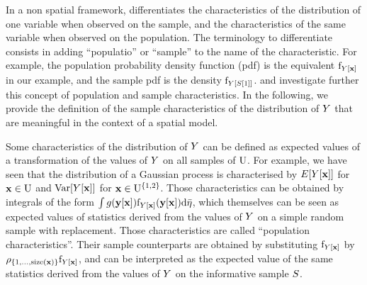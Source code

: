 In a non spatial framework,  \cite{pfefferman_1992} differentiates the characteristics of the distribution of one variable when observed on the sample, and the characteristics of the same variable when observed on the population. The terminology to differentiate consists in adding ``populatio'' or ``sample'' to the name of the characteristic. For example, the population probability density function (pdf) is the equivalent  $\mathrm{f}_{Y[\mathbf{x}]}$ in our example, and the sample pdf is the density $\mathrm{f}_{Y[S[1]]}$. \cite{bonnery2012uniform} and \cite{dbb1} investigate further this concept of population and sample characteristics.
In the following, we provide the definition of the sample characteristics of the distribution of $Y$ that are meaningful in the context of a spatial model.



Some characteristics of the distribution of $Y$ can be  defined as expected values of a transformation of the values of $Y$ on all samples of $\mathrm{U}$.
For example, we have seen that the distribution of 
a Gaussian process is characterised by $E[Y[\mathbf{x}]]$ for $\mathbf{x}\in \mathrm{U}$ and
$\mathrm{Var}[Y[\mathbf{x}]]$ for $\mathbf{x}\in \mathrm{U}^{\{1,2\}}$. Those characteristics can be obtained by integrals of the form $\int g(\mathbf{y}[\mathbf{x}]) \mathrm{f}_{Y[\mathbf{x}]}(\mathbf{y}[\mathbf{x}])\mathrm{d}\bar{\eta}$, which themselves can be seen as expected values of statistics derived from the values of $Y$ on a simple random sample with replacement.
Those characteristics are called ``population characteristics''. Their sample counterparts are obtained by substituting $ \mathrm{f}_{Y[\mathbf{x}]}$ by $\rho_{\{1,\ldots,\mathrm{size}(\mathbf{x})\}}\mathrm{f}_{Y[\mathbf{x}]}$, and can be interpreted as the expected value of the same statistics derived from the values of $Y$ on the informative sample $S$.







